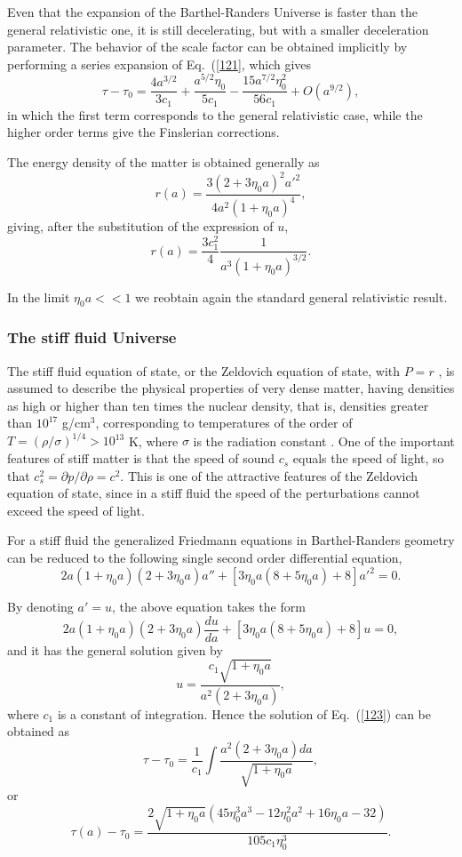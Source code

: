 \documentclass[aps,superscriptaddress, showpacs,preprintnumbers, superscriptaddress, nofootinbibt,twocolumn]{revtex4-2}
\def\be{\begin{equation}}
\def\ee{\end{equation}}
\begin{document}
Even that the expansion of the Barthel-Randers Universe is faster than the general relativistic one, it is still decelerating, but with a smaller deceleration parameter. The behavior of the scale factor can be obtained implicitly by performing a series expansion of Eq.~(\ref{121}, which gives
\be
\tau -\tau _0=\frac{4 a^{3/2}}{3 c_1}+\frac{a^{5/2} \eta _0}{5 c_1}-\frac{15 a^{7/2} \eta _0^2}{56 c_1}+O\left(a^{9/2}\right),
\ee
in which the first term corresponds to the general relativistic case, while the higher order terms give the Finslerian corrections.

The energy density of the matter is obtained generally as
\be
r(a)= \frac{3 \left(2+3 \eta _0
   a\right)^2 a'^2}{4 a^2 (1+\eta _0 a
   )^4},
\ee
giving, after the substitution of the expression of $u$,
\be
r(a)=\frac{3c_1^2}{4}\frac{1}{a^3\left(1+\eta _0a\right)^{3/2}}.
\ee

In the limit $\eta _0a<<1$ we reobtain again the standard general relativistic result.

\subsubsection{The stiff fluid Universe}

The stiff fluid equation of state, or the Zeldovich equation of state,  with $P=r$ \cite{stiff1,stiff2},  is assumed to describe the physical properties of very dense matter, having densities as high or higher than ten times the nuclear density, that is, densities greater
than $10^{17}$ g/cm$^3$, corresponding to temperatures of the order of $T = (\rho /\sigma)^{1/4} > 10^{13}$ K, where $\sigma$ is the radiation constant \cite{stiff2}. One of the important features of stiff matter is that the speed of sound $c_s$ equals the speed of light, so that $c_s^2=\partial p/\partial \rho=c^2$. This is one of the attractive features of the Zeldovich equation of state, since in a stiff fluid the speed of the perturbations cannot exceed the speed of light.

For a stiff fluid the generalized Friedmann equations in Barthel-Randers geometry can be reduced to the following single second order differential equation,
\be\label{123}
2 a \left(1+\eta _0 a\right) \left(2+3 \eta _0 a\right) a''+\left[3
   \eta _0 a \left(8+5 \eta _0 a\right)+8\right] a'^2=0.
\ee

By denoting $a'=u$, the above equation takes the form
\be
2 a \left(1+\eta _0 a\right) \left(2+3 \eta _0 a\right) \frac{du}{da}+\left[3
   \eta _0 a \left(8+5 \eta _0 a\right)+8\right] u=0,
\ee
and it has the general solution given by
\be
u=\frac{c_1 \sqrt{1+\eta _0 a }}{a^2 \left(2+3 \eta _0a
   \right)},
\ee
where $c_1$ is a constant of integration.
Hence the solution of Eq.~(\ref{123}) can be obtained as
\be
\tau-\tau_0=\frac{1}{c_1}\int{\frac{a^2\left(2+3\eta_0a\right)da}{\sqrt{1+\eta _0a}}},
\ee
or
\be
\tau (a)-\tau_0=\frac{2 \sqrt{1+\eta _0a } \left(45 \eta _0^3a^3 -12 \eta _0^2a^2 +16 \eta _0 a -32\right)}{105 c_1 \eta _0^3}.
\ee
\end{document}
